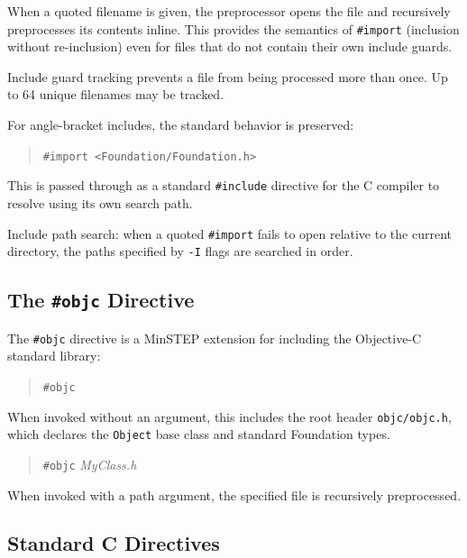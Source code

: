 \documentclass[11pt,twoside]{article}
\newcommand{\meta}[1]{{\itshape #1}}
\begin{document}
When a quoted filename is given, the preprocessor opens the file and
recursively preprocesses its contents inline.  This provides the
semantics of {\tt \#import} (inclusion without re-inclusion) even for
files that do not contain their own include guards.

Include guard tracking prevents a file from being processed more than
once.  Up to 64 unique filenames may be tracked.

For angle-bracket includes, the standard behavior is preserved:
\begin{quote}
{\tt \#import <Foundation/Foundation.h>}
\end{quote}

This is passed through as a standard {\tt \#include} directive for the C
compiler to resolve using its own search path.

Include path search: when a quoted {\tt \#import} fails to open relative
to the current directory, the paths specified by {\tt -I} flags are
searched in order.

\subsection{The {\tt \#objc} Directive}

The {\tt \#objc} directive is a MinSTEP extension for including the
Objective-C standard library:
\begin{quote}
{\tt \#objc}
\end{quote}

When invoked without an argument, this includes the root header
{\tt objc/objc.h}, which declares the {\tt Object} base class and
standard Foundation types.

\begin{quote}
{\tt \#objc} {\meta{MyClass.h}}
\end{quote}

When invoked with a path argument, the specified file is recursively
preprocessed.

\subsection{Standard C Directives}
\end{document}
